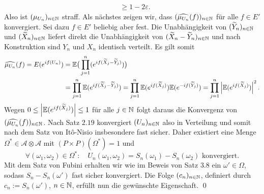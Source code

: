 \begin{proof*}
\begin{align*}
                                                              &\geq 1 - 2 \varepsilon.                                              
    \end{align*}
    Also ist $(\mu_{U_n})_{n \in \mathbb{N}}$ straff. 
    Als nächstes zeigen wir, dass $(\widehat{\mu_{U_n}}(f))_{n \in \mathbb{N}}$ für alle $f \in E'$ konvergiert. Sei dazu $f \in E'$ beliebig aber fest. 
    Die Unabhängigkeit von $(\widetilde{Y}_n)_{n \in \mathbb{N}}$ und $(\widetilde{X}_n)_{n \in \mathbb{N}}$ liefert direkt die Unabhängigkeit von $(\widetilde{X}_n - \widetilde{Y}_n)_{n \in \mathbb{N}}$
    und nach Konstruktion sind $Y_n$ und $X_n$ identisch verteilt. Es gilt somit
    \begin{align*}
        \widehat{\mu_{U_n}}(f) = E(e^{if(U_n)}) &= \mathbb{E}\big(\prod_{j=1}^n(e^{if(\widetilde{X}_j-\widetilde{Y}_j)})\big) \\\
                                                &= \prod_{j=1}^n \mathbb{E}(e^{if(\widetilde{X}_j-\widetilde{Y}_j)})
                                                 = \prod_{j=1}^n \mathbb{E}(e^{if(\widetilde{X}_j)})\mathbb{E}(e^{-if(\widetilde{Y}_j)})
                                                 = \prod_{j=1}^n \left| \mathbb{E}(e^{if(\widetilde{X}_j)}) \right|^2.
    \end{align*}
    Wegen $0 \leq \left| \mathbb{E}(e^{if(\widetilde{X}_j)}) \right| \leq 1$ für alle $j \in \mathbb{N}$ folgt daraus die Konvergenz von $(\widehat{\mu_{U_n}}(f))_{n \in \mathbb{N}}$. 
    Nach Satz $2.19$ konvergiert $(U_n)_{n \in \mathbb{N}}$ also in Verteilung und somit nach dem Satz von Itô-Nisio insbesondere fast sicher. 
    Daher existiert eine Menge $\Omega^* \in \mathcal{A} \otimes \mathcal{A}$ mit $(P\times P)(\Omega^*) = 1$ und 
    $$
        \forall (\omega_1, \omega_2) \in \Omega^*: \quad U_n(\omega_1, \omega_2) = S_n(\omega_1) - S_n(\omega_2) \text{ konvergiert.}
    $$
    Mit dem Satz von Fubini erhalten wir wie im Beweis von Satz $3.8$ ein $\omega' \in \Omega$, sodass $S_n - S_n(\omega')$ fast sicher konvergiert. 
    Die Folge $(c_n)_{n \in \mathbb{N}}$, definiert durch $c_n := S_n(\omega')$, $n \in \mathbb{N}$, erfüllt nun die gewünschte Eigenschaft. \qed

\end{proof*}

